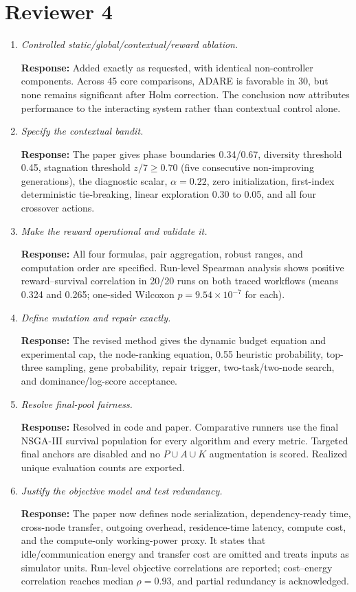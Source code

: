 \documentclass[11pt]{article}
\newcommand{\response}[1]{\par\smallskip\noindent\textcolor{blue!55!black}{\textbf{Response:} #1}\par\medskip}
\begin{document}
\section*{Reviewer 4}
\begin{enumerate}
\item \emph{Controlled static/global/contextual/reward ablation.}
\response{Added exactly as requested, with identical non-controller components. Across 45 core comparisons, ADARE is favorable in 30, but none remains significant after Holm correction. The conclusion now attributes performance to the interacting system rather than contextual control alone.}

\item \emph{Specify the contextual bandit.}
\response{The paper gives phase boundaries 0.34/0.67, diversity threshold 0.45, stagnation threshold $z/7\geq0.70$ (five consecutive non-improving generations), the diagnostic scalar, $\alpha=0.22$, zero initialization, first-index deterministic tie-breaking, linear exploration 0.30 to 0.05, and all four crossover actions.}

\item \emph{Make the reward operational and validate it.}
\response{All four formulas, pair aggregation, robust ranges, and computation order are specified. Run-level Spearman analysis shows positive reward--survival correlation in 20/20 runs on both traced workflows (means 0.324 and 0.265; one-sided Wilcoxon $p=9.54\times10^{-7}$ for each).}

\item \emph{Define mutation and repair exactly.}
\response{The revised method gives the dynamic budget equation and experimental cap, the node-ranking equation, 0.55 heuristic probability, top-three sampling, gene probability, repair trigger, two-task/two-node search, and dominance/log-score acceptance.}

\item \emph{Resolve final-pool fairness.}
\response{Resolved in code and paper. Comparative runners use the final NSGA-III survival population for every algorithm and every metric. Targeted final anchors are disabled and no $P\cup A\cup K$ augmentation is scored. Realized unique evaluation counts are exported.}

\item \emph{Justify the objective model and test redundancy.}
\response{The paper now defines node serialization, dependency-ready time, cross-node transfer, outgoing overhead, residence-time latency, compute cost, and the compute-only working-power proxy. It states that idle/communication energy and transfer cost are omitted and treats inputs as simulator units. Run-level objective correlations are reported; cost--energy correlation reaches median $\rho=0.93$, and partial redundancy is acknowledged.}


\end{enumerate}
\end{document}
